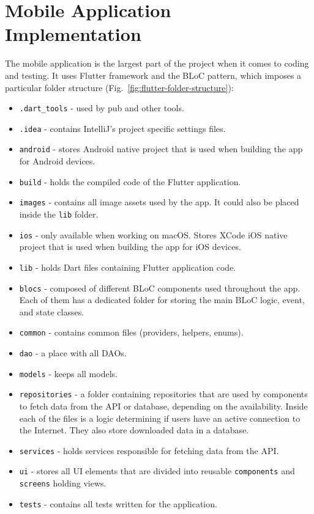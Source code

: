 \section{Mobile Application Implementation}
The mobile application is the largest part of the project when it comes to coding and testing. It uses Flutter framework and the BLoC pattern, which imposes a particular folder structure (Fig.~\ref{fig:flutter-folder-structure}):
\begin{itemize}
    \item \texttt{.dart\_tools} - used by pub and other tools.
    \item \texttt{.idea} - contains IntelliJ’s project specific settings files.
    \item \texttt{android} - stores Android native project that is used when building the app for Android devices.
    \item \texttt{build} - holds the compiled code of the Flutter application.
    \item \texttt{images} - contains all image assets used by the app. It could also be placed inside the \texttt{lib} folder.
    \item \texttt{ios} - only available when working on macOS. Stores XCode iOS native project that is used when building the app for iOS devices.
    \item \texttt{lib} - holds Dart files containing Flutter application code.
    \item \texttt{blocs} - composed of different BLoC components used throughout the app. Each of them has a dedicated folder for storing the main BLoC logic, event, and state classes.
    \item \texttt{common} - contains common files (providers, helpers, enums).
    \item \texttt{dao} - a place with all DAOs.
    \item \texttt{models} - keeps all models.
    \item \texttt{repositories} - a folder containing repositories that are used by components to fetch data from the API or database, depending on the availability. Inside each of the files is a logic determining if users have an active connection to the Internet. They also store downloaded data in a database.
    \item \texttt{services} - holds services responsible for fetching data from the API.
    \item \texttt{ui} - stores all UI elements that are divided into reusable \texttt{components} and \texttt{screens} holding views.
    \item \texttt{tests} - contains all tests written for the application.
\end{itemize}


